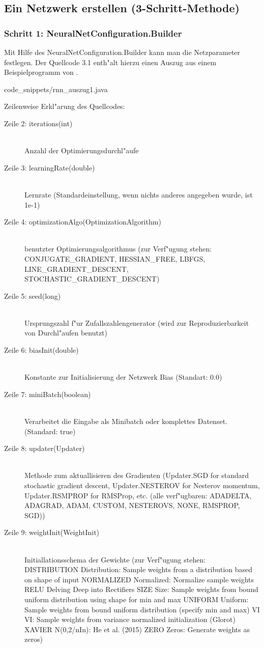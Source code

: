{\subsection{Ein Netzwerk erstellen (3-Schritt-Methode)}

\subsubsection{Schritt 1: NeuralNetConfiguration.Builder}
Mit Hilfe des NeuralNetConfiguration.Builder kann man die Netzparameter festlegen. Der Quellcode 3.1 enth"alt hierzu einen Auszug aus einem Beispielprogramm von \cite{DL4J}.

{code_snippets/rnn_auszug1.java}

Zeilenweise Erkl"arung des Quellcodes:
\begin{description}
\item[Zeile 2: iterations(int)]\hfill \\Anzahl der Optimierungsdurchl"aufe
\item[Zeile 3: learningRate(double)]\hfill \\Lernrate (Standardeinstellung, wenn nichts anderes angegeben wurde, ist 1e-1)
\item[Zeile 4: optimizationAlgo(OptimizationAlgorithm)]\hfill \\benutzter Optimierungsalgorithmus (zur Verf"ugung stehen: CONJUGATE\_GRADIENT, HESSIAN\_FREE, LBFGS, LINE\_GRADIENT\_DESCENT, STOCHASTIC\_GRADIENT\_DESCENT)
\item[Zeile 5: seed(long)]\hfill \\Ursprungszahl f"ur Zufallszahlengenerator (wird zur Reproduzierbarkeit von Durchl"aufen benutzt)
\item[Zeile 6: biasInit(double)]\hfill \\Konstante zur Initialisierung der Netzwerk Bias (Standart: 0.0) 
\item[Zeile 7: miniBatch(boolean)]\hfill \\Verarbeitet die Eingabe als Minibatch oder komplettes Datenset. (Standard: true)
\item[Zeile 8: updater(Updater)]\hfill \\Methode zum aktuallisieren des Gradienten (Updater.SGD for standard stochastic gradient descent, Updater.NESTEROV for Nesterov momentum, Updater.RSMPROP for RMSProp, etc. (alle verf"ugbaren: ADADELTA, ADAGRAD, ADAM, CUSTOM, NESTEROVS, NONE, RMSPROP, SGD))
\item[Zeile 9: weightInit(WeightInit)]\hfill \\Initiallationsschema der Gewichte
(zur Verf"ugung stehen:
DISTRIBUTION Distribution: Sample weights from a distribution based on shape of input
NORMALIZED Normalized: Normalize sample weights
RELU Delving Deep into Rectifiers
SIZE Size: Sample weights from bound uniform distribution using shape for min and max
UNIFORM Uniform: Sample weights from bound uniform distribution (specify min and max)
VI VI: Sample weights from variance normalized initialization (Glorot)
XAVIER N(0,2/nIn): He et al. (2015)
ZERO Zeros: Generate weights as zeros)
\end{description}

}
